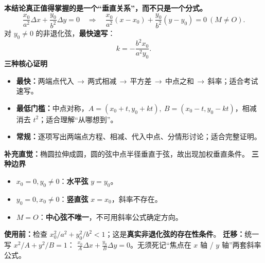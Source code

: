 \clearpage
\begin{summarybox}
\textbf{\textcolor{CSummary}{本结论真正值得掌握的是一个“垂直关系”，而不只是一个分式。}}
\[
\boxed{\frac{x_0}{a^2}\Delta x+\frac{y_0}{b^2}\Delta y=0
\quad\Longrightarrow\quad
\frac{x_0}{a^2}(x-x_0)+\frac{y_0}{b^2}(y-y_0)=0\ (M\ne O).}
\]
对 $y_0\ne0$ 的非退化弦，\textbf{最快速写}：
\[
\boxed{\qquad k=-\frac{b^2x_0}{a^2y_0}.\qquad}
\]
\textbf{\textcolor{CSummary}{三种核心证明}}
\begin{itemize}[leftmargin=*,itemsep=0.25em]
\item \textbf{最快：}两端点代入\,$\to$\,两式相减\,$\to$\,平方差\,$\to$\,中点之和\,$\to$\,斜率；适合考试速写。
\item \textbf{最低门槛：}中点对称，$A=(x_0+t,y_0+kt),\ B=(x_0-t,y_0-kt)$，相减消去 $t^2$；适合理解“从哪想到”。
\item \textbf{常规：}逐项写出两端点方程、相减、代入中点、分情形讨论；适合完整证明。
\end{itemize}
\textbf{补充直觉：}椭圆拉伸成圆，圆的弦中点半径垂直于弦，故出现加权垂直条件。
\medskip
\textbf{\textcolor{CSummary}{三种边界}}
\begin{itemize}[leftmargin=*,itemsep=0.25em]
\item $x_0=0,y_0\ne0$：\textbf{水平弦} $y=y_0$。
\item $y_0=0,x_0\ne0$：\textbf{竖直弦} $x=x_0$，斜率不存在。
\item $M=O$：\textbf{中心弦不唯一}，不可用斜率公式确定方向。
\end{itemize}
\textbf{使用前：}检查 $x_0^2/a^2+y_0^2/b^2<1$；这是\textbf{真实非退化弦的存在性条件}。
\medskip
\textbf{\textcolor{CSummary}{迁移：}}统一写 $x^2/A+y^2/B=1$：
$\frac{x_0}{A}\Delta x+\frac{y_0}{B}\Delta y=0$。无须死记“焦点在 $x$ 轴 / $y$ 轴”两套斜率公式。
\end{summarybox}
